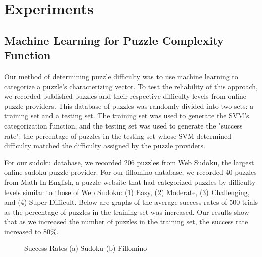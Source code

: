 \section{Experiments}

\subsection{Machine Learning for Puzzle Complexity Function}

Our method of determining puzzle difficulty was to use machine learning to categorize a puzzle's characterizing vector. To test the reliability of this approach, we recorded published puzzles and their respective difficulty levels from online puzzle providers. This database of puzzles was randomly divided into two sets: a training set and a testing set. The training set was used to generate the SVM's categorization function, and the testing set was used to generate the "success rate": the percentage of puzzles in the testing set whose SVM-determined difficulty matched the difficulty assigned by the puzzle providers. 

For our sudoku database, we recorded 206 puzzles from Web Sudoku, the largest online sudoku puzzle provider. For our fillomino database, we recorded 40 puzzles from Math In English, a puzzle website that had categorized puzzles by difficulty levels similar to those of Web Sudoku: (1) Easy, (2) Moderate, (3) Challenging, and (4) Super Difficult. Below are graphs of the average success rates of 500 trials as the percentage of puzzles in the training set was increased. Our results show that as we increased the number of puzzles in the training set, the success rate increased to $80 \%$.

\begin{figure}
     \centering
     \caption{Success Rates (a) Sudoku (b) Fillomino}
\end{figure}

